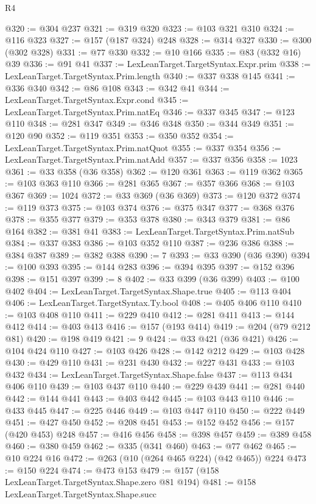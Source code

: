 \begin{lexlean}{R4}
\begin{coremodule}
@320 := @304 @237
@321 := @319 @320
@323 := @103 @321 @310
@324 := @116 @323
@327 := @157 (@187 @324) @248
@328 := @314 @327
@330 := @300 (@302 @328)
@331 := @77 @330
@332 := @10 @166
@335 := @83 (@332 @16) @39
@336 := @91 @41
@337 := LexLeanTarget.TargetSyntax.Expr.prim
@338 := LexLeanTarget.TargetSyntax.Prim.length
@340 := @337 @338 @145
@341 := @336 @340
@342 := @86 @108
@343 := @342 @41
@344 := LexLeanTarget.TargetSyntax.Expr.cond
@345 := LexLeanTarget.TargetSyntax.Prim.natEq
@346 := @337 @345
@347 := @123 @110
@348 := @281 @347
@349 := @346 @348
@350 := @344 @349
@351 := @120 @90
@352 := @119 @351
@353 := @350 @352
@354 := LexLeanTarget.TargetSyntax.Prim.natQuot
@355 := @337 @354
@356 := LexLeanTarget.TargetSyntax.Prim.natAdd
@357 := @337 @356
@358 := 1023
@361 := @33 @358 (@36 @358)
@362 := @120 @361
@363 := @119 @362
@365 := @103 @363 @110
@366 := @281 @365
@367 := @357 @366
@368 := @103 @367
@369 := 1024
@372 := @33 @369 (@36 @369)
@373 := @120 @372
@374 := @119 @373
@375 := @103 @374
@376 := @375 @347
@377 := @368 @376
@378 := @355 @377
@379 := @353 @378
@380 := @343 @379
@381 := @86 @164
@382 := @381 @41
@383 := LexLeanTarget.TargetSyntax.Prim.natSub
@384 := @337 @383
@386 := @103 @352 @110
@387 := @236 @386
@388 := @384 @387
@389 := @382 @388
@390 := 7
@393 := @33 @390 (@36 @390)
@394 := @100 @393
@395 := @144 @283
@396 := @394 @395
@397 := @152 @396
@398 := @151 @397
@399 := 8
@402 := @33 @399 (@36 @399)
@403 := @100 @402
@404 := LexLeanTarget.TargetSyntax.Shape.true
@405 := @113 @404
@406 := LexLeanTarget.TargetSyntax.Ty.bool
@408 := @405 @406 @110
@410 := @103 @408 @110
@411 := @229 @410
@412 := @281 @411
@413 := @144 @412
@414 := @403 @413
@416 := @157 (@193 @414)
@419 := @204 (@79 @212 @81)
@420 := @198 @419
@421 := 9
@424 := @33 @421 (@36 @421)
@426 := @104 @424 @110
@427 := @103 @426
@428 := @142 @212
@429 := @103 @428
@430 := @429 @110
@431 := @231 @430
@432 := @227 @431
@433 := @103 @432
@434 := LexLeanTarget.TargetSyntax.Shape.false
@437 := @113 @434 @406 @110
@439 := @103 @437 @110
@440 := @229 @439
@441 := @281 @440
@442 := @144 @441
@443 := @403 @442
@445 := @103 @443 @110
@446 := @433 @445
@447 := @225 @446
@449 := @103 @447 @110
@450 := @222 @449
@451 := @427 @450
@452 := @208 @451
@453 := @152 @452
@456 := @157 (@420 @453) @248
@457 := @416 @456
@458 := @398 @457
@459 := @389 @458
@460 := @380 @459
@462 := @335 (@341 @460)
@463 := @77 @462
@465 := @10 @224 @16
@472 := @263 (@10 (@264 @465 @224) (@42 @465)) @224
@473 := @150 @224
@474 := @473 @153
@479 := @157 (@158 LexLeanTarget.TargetSyntax.Shape.zero @81 @194)
@481 := @158 LexLeanTarget.TargetSyntax.Shape.succ

\end{coremodule}
\end{lexlean}
